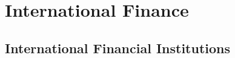 \chapter{International Finance}
\label{ch:international_finance}

\section{International Financial Institutions}

